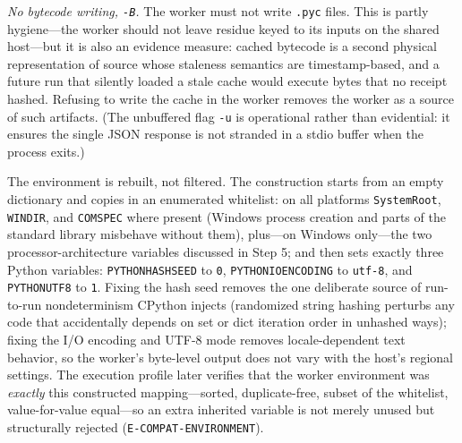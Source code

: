 \emph{No bytecode writing, \texttt{-B}.} The worker must not write \texttt{.pyc} files. This is partly hygiene---the worker should not leave residue keyed to its inputs on the shared host---but it is also an evidence measure: cached bytecode is a second physical representation of source whose staleness semantics are timestamp-based, and a future run that silently loaded a stale cache would execute bytes that no receipt hashed. Refusing to write the cache in the worker removes the worker as a source of such artifacts. (The unbuffered flag \texttt{-u} is operational rather than evidential: it ensures the single JSON response is not stranded in a stdio buffer when the process exits.)

The environment is rebuilt, not filtered. The construction starts from an empty dictionary and copies in an enumerated whitelist: on all platforms \texttt{SystemRoot}, \texttt{WINDIR}, and \texttt{COMSPEC} where present (Windows process creation and parts of the standard library misbehave without them), plus---on Windows only---the two processor-architecture variables discussed in Step 5; and then sets exactly three Python variables: \texttt{PYTHONHASHSEED} to \texttt{0}, \texttt{PYTHONIOENCODING} to \texttt{utf-8}, and \texttt{PYTHONUTF8} to \texttt{1}. Fixing the hash seed removes the one deliberate source of run-to-run nondeterminism CPython injects (randomized string hashing perturbs any code that accidentally depends on set or dict iteration order in unhashed ways); fixing the I/O encoding and UTF-8 mode removes locale-dependent text behavior, so the worker's byte-level output does not vary with the host's regional settings. The execution profile later verifies that the worker environment was \emph{exactly} this constructed mapping---sorted, duplicate-free, subset of the whitelist, value-for-value equal---so an extra inherited variable is not merely unused but structurally rejected (\texttt{E-COMPAT-ENVIRONMENT}).

